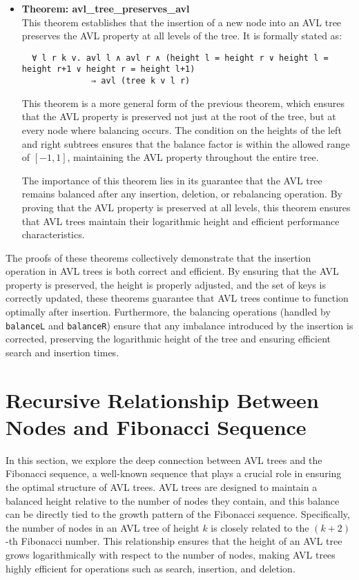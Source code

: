 \documentclass[12pt]{article}
\begin{document}
\begin{itemize}
  \item \textbf{Theorem: avl\_tree\_preserves\_avl} \\
  This theorem establishes that the insertion of a new node into an AVL tree preserves the AVL property at all levels of the tree. It is formally stated as:
  \begin{verbatim}
  ∀ l r k v. avl l ∧ avl r ∧ (height l = height r ∨ height l = height r+1 ∨ height r = height l+1)
              ⇒ avl (tree k v l r)
  \end{verbatim}
  This theorem is a more general form of the previous theorem, which ensures that the AVL property is preserved not just at the root of the tree, but at every node where balancing occurs. The condition on the heights of the left and right subtrees ensures that the balance factor is within the allowed range of \([-1, 1]\), maintaining the AVL property throughout the entire tree.

  The importance of this theorem lies in its guarantee that the AVL tree remains balanced after any insertion, deletion, or rebalancing operation. By proving that the AVL property is preserved at all levels, this theorem ensures that AVL trees maintain their logarithmic height and efficient performance characteristics.

\end{itemize}

The proofs of these theorems collectively demonstrate that the insertion operation in AVL trees is both correct and efficient. By ensuring that the AVL property is preserved, the height is properly adjusted, and the set of keys is correctly updated, these theorems guarantee that AVL trees continue to function optimally after insertion. Furthermore, the balancing operations (handled by \texttt{balanceL} and \texttt{balanceR}) ensure that any imbalance introduced by the insertion is corrected, preserving the logarithmic height of the tree and ensuring efficient search and insertion times.



\section{Recursive Relationship Between Nodes and Fibonacci Sequence}

In this section, we explore the deep connection between AVL trees and the Fibonacci sequence, a well-known sequence that plays a crucial role in ensuring the optimal structure of AVL trees. AVL trees are designed to maintain a balanced height relative to the number of nodes they contain, and this balance can be directly tied to the growth pattern of the Fibonacci sequence. Specifically, the number of nodes in an AVL tree of height \( k \) is closely related to the \( (k+2) \)-th Fibonacci number. This relationship ensures that the height of an AVL tree grows logarithmically with respect to the number of nodes, making AVL trees highly efficient for operations such as search, insertion, and deletion.
\end{document}
